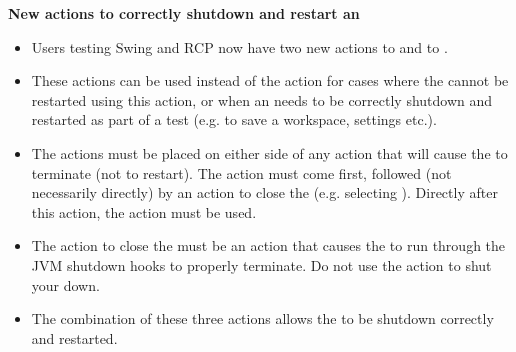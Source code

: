 \textbf{New actions to correctly shutdown and restart an \gdaut{}}
\begin{itemize}
\item Users testing Swing and RCP \gdauts{} now have two new actions to  and to . 
\item These actions can be used instead of the  action for cases where the \gdaut{} cannot be restarted using this action, or when an \gdaut{} needs to be correctly shutdown and restarted as part of a test (e.g. to save a workspace, settings etc.).
\item The actions must be placed on either side of any action that will cause the \gdaut{} to terminate (not to restart). The  action must come first, followed (not necessarily directly) by an action to close the \gdaut{} (e.g. selecting ). Directly after this action, the  action must be used.
\item The action to close the \gdaut{} must be an action that causes the \gdaut{} to run through the JVM shutdown hooks to properly terminate. Do not use the  action to shut your \gdaut{} down.
\item The combination of these three actions allows the \gdaut{} to be shutdown correctly and restarted. 
\end{itemize}
